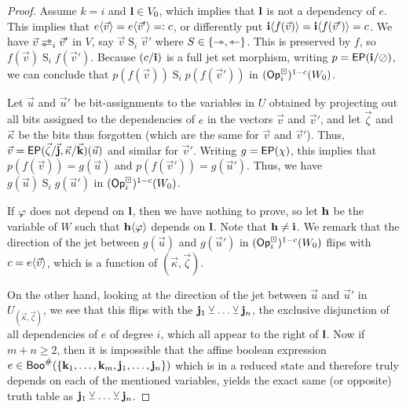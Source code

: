 \documentclass[a4paper]{memoir}
\begin{document}
\begin{proof}
	Assume $k = i$ and $\mathbf{l} \in V_0$, which implies that $\mathbf{l}$ is not a dependency of $e$.
	This implies that $e \langle \vec v \rangle = e \langle \vec v' \rangle =: c$, or differently put $\mathbf{i} \langle f(\vec v) \rangle = \mathbf{i} \langle f(\vec v') \rangle = c$.
	We have $\vec v \infrajet_i \vec v'$ in $V$, say $\vec v \mathrel{S}_i \vec v'$ where $S \in \mathopen{}\left\{ \rightarrowtriangle, \leftarrowtriangle \right\}\mathclose{}$.
	This is preserved by $f$, so $f(\vec v) \mathrel{S}_i f(\vec v')$.
	Because $(c/\mathbf{i})$ is a full jet set morphism, writing $p = \mathsf{EP}(\mathbf{i} / \oslash)$, we can conclude that $p(f(\vec v)) \mathrel{S}_i p(f(\vec v'))$ in $({\mathsf{Op}}^\boxdot_i)^{1-c}(W_0)$.
	
	Let $\vec u$ and $\vec u'$ be bit-assignments to the variables in $U$ obtained by projecting out all bits assigned to the dependencies of $e$ in the vectors $\vec v$ and $\vec v'$, and let $\vec \zeta$ and $\vec \kappa$ be the bits thus forgotten (which are the same for $\vec v$ and $\vec v'$).
	Thus, $\vec v = \mathsf{EP}(\vec \zeta/\vec{\mathbf{j}}, \vec \kappa/\vec{\mathbf{k}})(\vec u)$ and similar for $\vec v'$.
	Writing $g = \mathsf{EP}(\chi)$, this implies that $p(f(\vec v)) = g(\vec u)$ and $p(f(\vec v')) = g(\vec u')$.
	Thus, we have $g(\vec u) \mathrel S_i g(\vec u')$ in $({\mathsf{Op}}^\boxdot_i)^{1-c}(W_0)$.
	
	If $\varphi$ does not depend on $\mathbf{l}$, then we have nothing to prove,
	so let $\mathbf{h}$ be the variable of $W$ such that $\mathbf{h} \langle \varphi \rangle$ depends on $\mathbf{l}$. Note that $\mathbf{h} \neq \mathbf{i}$.
	We remark that the direction of the jet between $g(\vec u)$ and $g(\vec u')$ in $({\mathsf{Op}}^\boxdot_i)^{1-c}(W_0)$ flips with $c = e \langle \vec v \rangle$, which is a function of $(\vec \kappa, \vec \zeta)$.
	
	On the other hand, looking at the direction of the jet between $\vec u$ and $\vec u'$ in $U_{(\vec \kappa, \vec \zeta)}$, we see that this flips with the $\mathbf{j}_1 \veebar \ldots \veebar \mathbf{j}_n$, the exclusive disjunction of all dependencies of $e$ of degree $i$, which all appear to the right of $\mathbf{l}$.
	Now if $m+n \geq 2$, then it is impossible that the affine boolean expression $e \in \mathsf{Boo}^\#(\mathopen{}\left\{ \mathbf{k}_1, \ldots, \mathbf{k}_m, \mathbf{j}_1, \ldots, \mathbf{j}_n \right\}\mathclose{})$ which is in a reduced state and therefore truly depends on each of the mentioned variables, yields the exact same (or opposite) truth table as $\mathbf{j}_1 \veebar \ldots \veebar \mathbf{j}_n$.
	

\end{proof}
\end{document}
